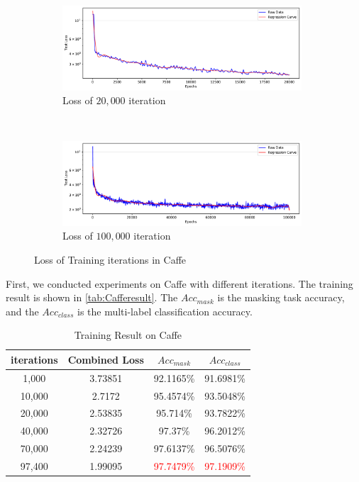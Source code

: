 \begin{spacing}{1.5}
\begin{figure}[ht]
    \centering
    \begin{subfigure}[b]{0.99\textwidth}
        \centering
        \includegraphics[width=0.98\textwidth, fbox]{Chapter5/testloss20000.pdf}
        \caption{Loss of $20,000$ iteration}
    \end{subfigure}
    \\
    \begin{subfigure}[b]{0.99\textwidth}
        \centering
        \includegraphics[width=0.98\textwidth, fbox]{Chapter5/testloss100000.pdf}
        \caption{Loss of $100,000$ iteration}
    \end{subfigure}
    \caption{Loss of Training iterations in Caffe}
    \label{fig:testloss}
\end{figure}


First, we conducted experiments on Caffe with different iterations. The training result is shown in \autoref{tab:Cafferesult}. The $Acc_{mask}$ is the masking task accuracy, and the $Acc_{class}$ is the multi-label classification accuracy.

\begin{table}[ht]
\centering
\caption{Training Result on Caffe}
\label{tab:Cafferesult}
\begin{tabular}{@{}cccc@{}}
\toprule
\textbf{iterations} & \textbf{Combined Loss} & \textbf{$Acc_{mask}$} & \textbf{$Acc_{class}$} \\ \midrule
1,000 & 3.73851 & 92.1165\% & 91.6981\% \\
10,000 & 2.7172 & 95.4574\% & 93.5048\% \\
20,000 & 2.53835 & 95.714\% & 93.7822\% \\
40,000 & 2.32726 & 97.37\% & 96.2012\% \\
70,000 & 2.24239 & 97.6137\% & 96.5076\% \\
97,400 & 1.99095 & \textcolor{red}{97.7479\%} & \textcolor{red}{97.1909\%} \\ \bottomrule
\end{tabular}
\end{table}


\end{spacing}

